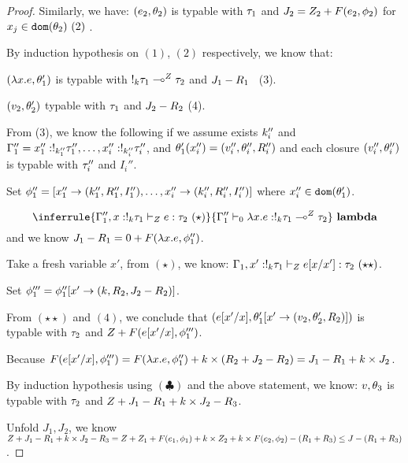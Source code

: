 \begin{proof}
   Similarly, we have: $(e_2, \theta_2)$ is  typable with $\tau_1$ and $J_2 = Z_2 + F(e_2, \phi_2)$ for $x_j \in \mathtt{dom}(\theta_2)~(2)$ .

   By induction hypothesis on $(1)$, $(2)$ respectively, we know that:
   
   $ ( \lambda x.e , \theta_1') $ is typable with $!_{k} \tau_1 \multimap^{Z} \tau_2$ and $J_1 - R_1$ ~(3). 
   
   $(v_2 , \theta_2')  $ typable with $ \tau_1 $ and $J_2 -R_2$ (4). 

   From (3), we know the following if we assume exists $k_i''$ and $\Gamma_1'' = x_1'' : !_{k_1''} \tau_1'', \ldots, x_i'' : !_{k_i''} \tau_i'' $, and $\theta_1'(x_i'') = (v_i'', \theta_i'', R_i'')$ and each closure $(v_i'', \theta_i'' )  $ is typable with $\tau_i''$ and $I_i''$.

 Set $\phi_1'' =[x_1'' \to (k_1'', R_1'', I_1'') , \ldots, x_i'' \to (k_i'', R_i'', I_i'')]$ where $x_i'' \in \mathtt{dom}(\theta_1')$.

   
   $$ \inferrule{
      \ictx \Gamma_1'', x: \bang{\idx} \type_1
      \tvdash{\nnatA }
      \expr: \type_2 ~(\star)
    }{
      \ictx \Gamma_1'' \tvdash{0} \lambda x. \expr : \bang{\idx} \type_1
      \lto{\nnatA} \type_2
    }~\textbf{lambda} $$
    and we know $J_1 - R_1 = 0 + F(  \lambda x. e , \phi_1'' )$.

    Take a fresh variable $x'$, from $(\star)$, we know: $ \Gamma_1, x': !_{k} \tau_1 \vdash_{Z }  e[x/x']: \tau_2 ~(\star\star) $.
    
   Set $\phi_1''' = \phi_1''[x' \to (k, R_2,  J_2-R_2 )]$.
    
   From $(\star\star)$ and $(4)$, we conclude that $( e[x'/x], \theta_1'[ x'  \to (v_2, \theta_2', R_2  ) ] )$ is typable with $\tau_2$ and $ Z+ F( e[x'/x], \phi_1''' )$.

Because  $ F( e[x'/x], \phi_1''' ) =   F(\lambda x.e, \phi_1'') +k \times (R_2 + J_2 -R_2 ) = J_1 - R_1 + k \times  J_2$.

    By induction hypothesis using $(\clubsuit)$ and the above statement, we know:
    $v, \theta_3$ is typable with $\tau_2$ and $Z + J_1 - R_1 +k \times  J_2 - R_3$.

    Unfold $J_1, J_2$, we know 
    $ Z + J_1 - R_1 +k \times  J_2 - R_3  = Z + Z_1 + F(e_1, \phi_1)  + k \times Z_2 + k \times F(e_2, \phi_2)  - (R_1 + R_3) \leq  J- (R_1+R_3) $.


\end{proof}
